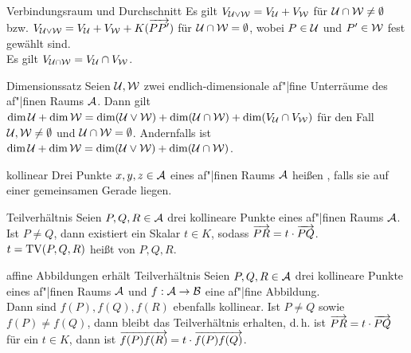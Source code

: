 \begin{Lemma}{Verbindungsraum und Durchschnitt}
    Es gilt $V_{\mathcal{U} \lor \mathcal{W}} = V_{\mathcal{U}} + V_{\mathcal{W}}$ für
    $\mathcal{U} \cap \mathcal{W} \not= \emptyset$ bzw.
    $V_{\mathcal{U} \lor \mathcal{W}} = V_{\mathcal{U}} + V_{\mathcal{W}} +
    K (\overrightarrow{PP'})$ für $\mathcal{U} \cap \mathcal{W} = \emptyset$,
    wobei $P \in \mathcal{U}$ und $P' \in \mathcal{W}$ fest gewählt sind. \\
    Es gilt $V_{\mathcal{U} \cap \mathcal{W}} = V_{\mathcal{U}} \cap V_{\mathcal{W}}$.
\end{Lemma}

\begin{Satz}{Dimensionssatz}
    Seien $\mathcal{U}, \mathcal{W}$ zwei endlich-dimensionale af"|fine Unterräume
    des af"|finen Raums $\mathcal{A}$.
    Dann gilt $\dim \mathcal{U} + \dim \mathcal{W} =
    \dim(\mathcal{U} \lor \mathcal{W}) + \dim(\mathcal{U} \cap \mathcal{W}) +
    \dim(V_{\mathcal{U}} \cap V_{\mathcal{W}})$ für den Fall
    $\mathcal{U}, \mathcal{W} \not= \emptyset$ und
    $\mathcal{U} \cap \mathcal{W} = \emptyset$.
    Andernfalls ist $\dim \mathcal{U} + \dim \mathcal{W} =
    \dim(\mathcal{U} \lor \mathcal{W}) + \dim(\mathcal{U} \cap \mathcal{W})$.
\end{Satz}

\pagebreak

\begin{Def}{kollinear}
    Drei Punkte $x, y, z \in \mathcal{A}$ eines af"|finen Raums $\mathcal{A}$
    heißen , falls sie auf einer gemeinsamen Gerade liegen.
\end{Def}

\begin{Def}{Teilverhältnis}
    Seien $P, Q, R \in \mathcal{A}$ drei kollineare Punkte eines af"|finen Raums
    $\mathcal{A}$. \\
    Ist $P \not= Q$, dann existiert ein Skalar $t \in K$, sodass
    $\overrightarrow{PR} = t \cdot \overrightarrow{PQ}$. \\
    $t = \operatorname{TV}(P, Q, R)$ heißt  von $P, Q, R$.
\end{Def}

\begin{Satz}{af{}fine Abbildungen erhält Teilverhältnis}
    Seien $P, Q, R \in \mathcal{A}$ drei kollineare Punkte eines af"|finen Raums
    $\mathcal{A}$ und $f: \mathcal{A} \rightarrow \mathcal{B}$ eine af"|fine
    Abbildung. \\
    Dann sind $f(P), f(Q), f(R)$ ebenfalls kollinear.
    Ist $P \not= Q$ sowie $f(P) \not= f(Q)$, dann bleibt das Teilverhältnis
    erhalten, d.\,h. ist $\overrightarrow{PR} = t \cdot \overrightarrow{PQ}$ für ein $t \in K$,
    dann ist $\overrightarrow{f(P)f(R)} = t \cdot \overrightarrow{f(P)f(Q)}$.
\end{Satz}

